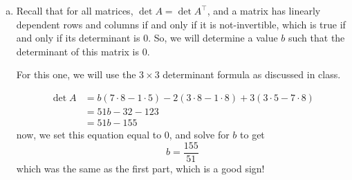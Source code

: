 \documentclass[answers]{exam}
\begin{document}
\begin{questions}
\begin{solution}
\begin{enumerate}[(a)]
\begin{eqnarray*}
{                        0 & 0 & \frac{310}{19} - \frac{102b}{19}
                    }\\
                    &\xrightarrow{R_3\gets \frac{19}{2}R_3}&\bMat{
                        1 & \frac{3}{2} & \frac{b}{2} \\
                        0 & 1 & -\frac{6}{19} + \frac{7b}{19} \\
                        0 & 0 & 155 - 51b
                    }
                \end{eqnarray*}
                Since we want to ensure that this matrix is linearly \textbf{dependent}, we
                want to ensure that\\$155-51b=0$, which happens when

                \[
                    b = \frac{155}{51}.
                \]
            \item Recall that for all matrices, $\det{A}=\det{A^\top}$, and a matrix has linearly dependent
                rows and columns if and only if it is not-invertible, which is true if and only if
                its determinant is $0$. So, we will determine a value $b$ such that the determinant
                of this matrix is $0$.

                For this one, we will use the $3\times 3$ determinant formula as discussed in class.

                \begin{align*}
                    \det{A} &= b(7\cdot 8 - 1\cdot 5) - 2(3\cdot 8-1\cdot 8) + 3(3\cdot 5-7\cdot 8) \\
                    &= 51b - 32 -123\\
                    &= 51b - 155
                \end{align*}
                now, we set this equation equal to $0$, and solve for $b$ to get
                \[
                    b = \frac{155}{51}
                \]
                which was the same as the first part, which is a good sign!
        \end{enumerate}
    \end{solution}
\end{questions}
\end{document}

